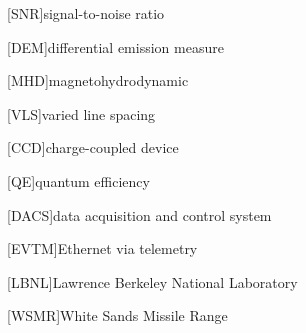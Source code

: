 [SNR]{signal-to-noise ratio}
\newcommand{\SNR}{\ac{SNR}}
\newcommand{\SNRShort}{\acs{SNR}}
\newcommand{\SNRCapital}{\Ac{SNR}}

[DEM]{differential emission measure}
\newcommand{\DEM}{\ac{DEM}}
\newcommand{\DEMs}{\acp{DEM}}
\newcommand{\DEMCapital}{\Ac{DEM}}
\newcommand{\DEMCapitals}{\Acp{DEM}}

[MHD]{magnetohydrodynamic}
\newcommand{\MHD}{\ac{MHD}}
\newcommand{\MHDCapital}{\Ac{MHD}}

[VLS]{varied line spacing}
\newcommand{\VLS}{\ac{VLS}}
\newcommand{\VLSCapital}{\Ac{VLS}}

[CCD]{charge-coupled device}
\newcommand{\CCD}{\ac{CCD}}
\newcommand{\CCDs}{\acp{CCD}}
\newcommand{\CCDCapital}{\Ac{CCD}}
\newcommand{\CCDCapitals}{\Acp{CCD}}

[QE]{quantum efficiency}
\newcommand{\QE}{\ac{QE}}
\newcommand{\QECapital}{\Ac{QE}}

[DACS]{data acquisition and control system}
\newcommand{\DACS}{\ac{DACS}}
\newcommand{\DACSCapital}{\Ac{DACS}}

[EVTM]{Ethernet via telemetry}
\newcommand{\EVTM}{\ac{EVTM}}
\newcommand{\EVTMCapital}{\Ac{EVTM}}

[LBNL]{Lawrence Berkeley National Laboratory}
\newcommand{\LBNL}{\ac{LBNL}}
\newcommand{\LBNLCapital}{\Ac{LBNL}}

[WSMR]{White Sands Missile Range}
\newcommand{\WSMR}{\ac{WSMR}}
\newcommand{\WSMRCapital}{\Ac{WSMR}}
